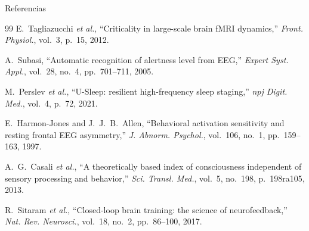 \begin{frame}[allowframebreaks]{Referencias}
\begin{thebibliography}{99}
    E.~Tagliazucchi \textit{et al.}, ``Criticality in large-scale brain fMRI dynamics,''
    \textit{Front. Physiol.}, vol.~3, p.~15, 2012.

    A.~Subasi, ``Automatic recognition of alertness level from EEG,''
    \textit{Expert Syst. Appl.}, vol.~28, no.~4, pp.~701--711, 2005.

    M.~Perslev \textit{et al.}, ``U-Sleep: resilient high-frequency sleep staging,''
    \textit{npj Digit. Med.}, vol.~4, p.~72, 2021.

    E.~Harmon-Jones and J.~J.~B.~Allen,
    ``Behavioral activation sensitivity and resting frontal EEG asymmetry,''
    \textit{J. Abnorm. Psychol.}, vol.~106, no.~1, pp.~159--163, 1997.

    A.~G.~Casali \textit{et al.}, ``A theoretically based index of consciousness
    independent of sensory processing and behavior,''
    \textit{Sci. Transl. Med.}, vol.~5, no.~198, p.~198ra105, 2013.

    R.~Sitaram \textit{et al.}, ``Closed-loop brain training: the science of neurofeedback,''
    \textit{Nat. Rev. Neurosci.}, vol.~18, no.~2, pp.~86--100, 2017.

  \end{thebibliography}
\end{frame}
